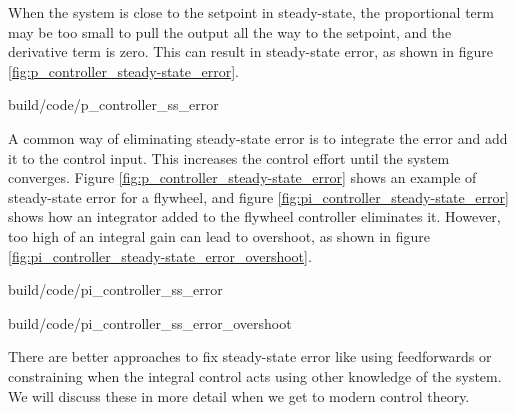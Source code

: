 When the \gls{system} is close to the \gls{setpoint} in steady-state, the
proportional term may be too small to pull the \gls{output} all the way to the
\gls{setpoint}, and the derivative term is zero. This can result in
\gls{steady-state error}, as shown in figure
\ref{fig:p_controller_steady-state_error}.

\begin{svg}{build/code/p_controller_ss_error}
  \caption{P controller with steady-state error}
  \label{fig:p_controller_steady-state_error}
\end{svg}

A common way of eliminating \gls{steady-state error} is to integrate the
\gls{error} and add it to the \gls{control input}. This increases the
\gls{control effort} until the \gls{system} converges. Figure
\ref{fig:p_controller_steady-state_error} shows an example of
\gls{steady-state error} for a flywheel, and figure
\ref{fig:pi_controller_steady-state_error} shows how an integrator added to the
flywheel controller eliminates it. However, too high of an integral gain can
lead to overshoot, as shown in figure
\ref{fig:pi_controller_steady-state_error_overshoot}.

\begin{bookfigure}
  \begin{minisvg}{build/code/pi_controller_ss_error}
    \caption{PI controller that eliminates steady-state error}
    \label{fig:pi_controller_steady-state_error}
  \end{minisvg}
  \hfill
  \begin{minisvg}{build/code/pi_controller_ss_error_overshoot}
    \caption{PI controller with overshoot from a large $K_i$ value}
    \label{fig:pi_controller_steady-state_error_overshoot}
  \end{minisvg}
\end{bookfigure}

There are better approaches to fix \gls{steady-state error} like using
feedforwards or constraining when the integral control acts using other
knowledge of the \gls{system}. We will discuss these in more detail when we get
to modern control theory.
